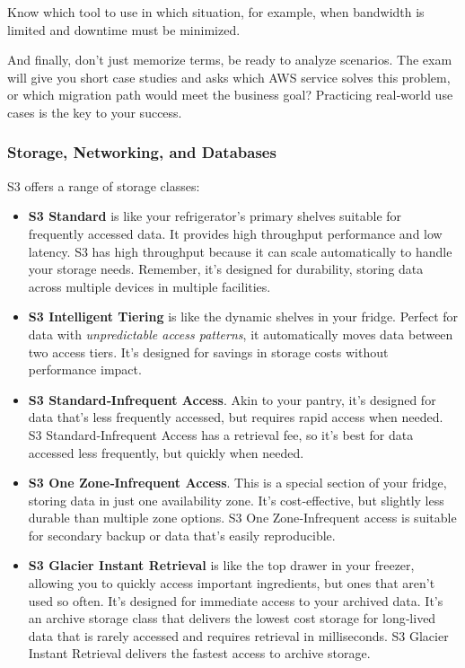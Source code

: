 Know which tool to use in which situation, for example,
when bandwidth is limited and downtime must be minimized.

And finally, don't just memorize terms, be ready to analyze scenarios.
The exam will give you short case studies and asks which AWS service solves
this problem, or which migration path would meet the business goal? Practicing
real‑world use cases is the key to your success.

\subsubsection{Storage, Networking, and Databases}

S3 offers a range of storage classes:

\begin{itemize}
    \item \textbf{S3 Standard} is like your refrigerator's primary shelves suitable for frequently accessed data. It provides high throughput performance and low latency. S3 has high throughput because it can scale automatically to handle your storage needs. Remember, it's designed for durability, storing data across multiple devices in multiple facilities.
    \item \textbf{S3 Intelligent Tiering} is like the dynamic shelves in your fridge. Perfect for data with \textit{unpredictable access patterns}, it automatically moves data between two access tiers. It's designed for savings in storage costs without performance impact.
    \item \textbf{S3 Standard‑Infrequent Access}. Akin to your pantry, it's designed for data that's less frequently accessed, but requires rapid access when needed. S3 Standard‑Infrequent Access has a retrieval fee, so it's best for data accessed less frequently, but quickly when needed.
    \item \textbf{S3 One Zone‑Infrequent Access}. This is a special section of your fridge, storing data in just one availability zone. It's cost‑effective, but slightly less durable than multiple zone options. S3 One Zone‑Infrequent access is suitable for secondary backup or data that's easily reproducible.
    \item \textbf{S3 Glacier Instant Retrieval} is like the top drawer in your freezer, allowing you to quickly access important ingredients, but ones that aren't used so often. It's designed for immediate access to your archived data. It's an archive storage class that delivers the lowest cost storage for long‑lived data that is rarely accessed and requires retrieval in milliseconds. S3 Glacier Instant Retrieval delivers the fastest access to archive storage.

\end{itemize}
